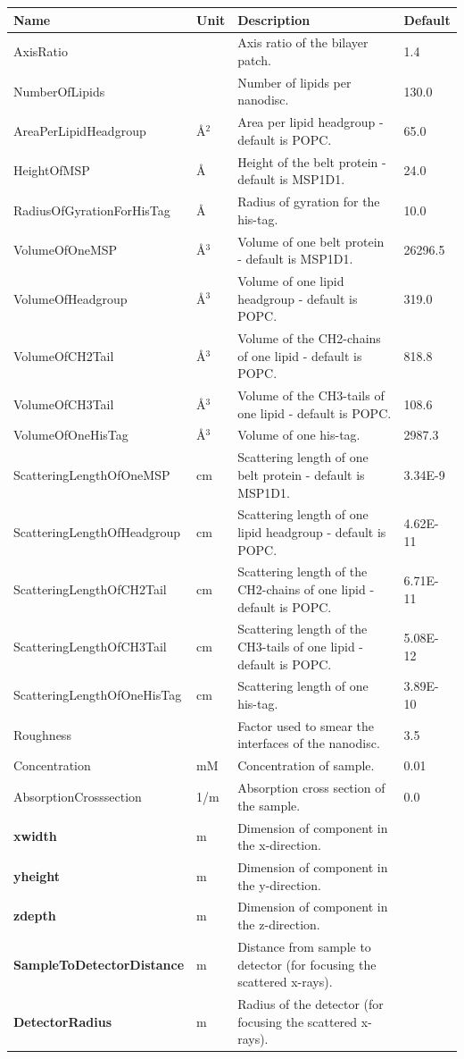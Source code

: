 \begin{longtable}{p{}p{}p{}p{}}
\toprule
\textbf{Name} & \textbf{Unit} & \textbf{Description} & \textbf{Default} \\
\midrule
\endhead
AxisRatio &  & Axis ratio of the bilayer patch. & 1.4 \\
NumberOfLipids &  & Number of lipids per nanodisc. & 130.0 \\
AreaPerLipidHeadgroup & \AA{}$^{2}$ & Area per lipid headgroup - default is POPC. & 65.0 \\
HeightOfMSP & \AA{} & Height of the belt protein - default is MSP1D1. & 24.0 \\
RadiusOfGyrationForHisTag & \AA{} & Radius of gyration for the his-tag. & 10.0 \\
VolumeOfOneMSP & \AA{}$^{3}$ & Volume of one belt protein - default is MSP1D1. & 26296.5 \\
VolumeOfHeadgroup & \AA{}$^{3}$ & Volume of one lipid headgroup - default is POPC. & 319.0 \\
VolumeOfCH2Tail & \AA{}$^{3}$ & Volume of the CH2-chains of one lipid - default is POPC. & 818.8 \\
VolumeOfCH3Tail & \AA{}$^{3}$ & Volume of the CH3-tails of one lipid - default is POPC. & 108.6 \\
VolumeOfOneHisTag & \AA{}$^{3}$ & Volume of one his-tag. & 2987.3 \\
ScatteringLengthOfOneMSP & cm & Scattering length of one belt protein - default is MSP1D1. & 3.34E-9 \\
ScatteringLengthOfHeadgroup & cm & Scattering length of one lipid headgroup - default is POPC. & 4.62E-11 \\
ScatteringLengthOfCH2Tail & cm & Scattering length of the CH2-chains of one lipid - default is POPC. & 6.71E-11 \\
ScatteringLengthOfCH3Tail & cm & Scattering length of the CH3-tails of one lipid - default is POPC. & 5.08E-12 \\
ScatteringLengthOfOneHisTag & cm & Scattering length of one his-tag. & 3.89E-10 \\
Roughness &  & Factor used to smear the interfaces of the nanodisc. & 3.5 \\
Concentration & mM & Concentration of sample. & 0.01 \\
AbsorptionCrosssection & 1/m & Absorption cross section of the sample. & 0.0 \\
\textbf{xwidth} & m & Dimension of component in the x-direction. &  \\
\textbf{yheight} & m & Dimension of component in the y-direction. &  \\
\textbf{zdepth} & m & Dimension of component in the z-direction. &  \\
\textbf{SampleToDetectorDistance} & m & Distance from sample to detector (for focusing the scattered x-rays). &  \\
\textbf{DetectorRadius} & m & Radius of the detector (for focusing the scattered x-rays). &  \\
\bottomrule
\end{longtable}

